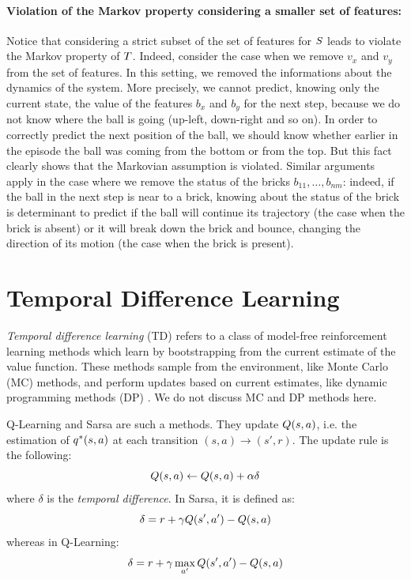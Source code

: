 \begin{example}
	\paragraph{Violation of the Markov property considering a smaller set of features:}
	Notice that considering a strict subset of the set of features for $S$ leads to violate the Markov property of $T$. Indeed, consider the case when we remove $v_x$ and $v_y$ from the set of features. In this setting, we removed the informations about the dynamics of the system. More precisely, we cannot predict, knowing only the current state, the value of the features $b_x$ and $b_y$ for the next step, because we do not know where the ball is going (up-left, down-right and so on). In order to correctly predict the next position of the ball, we should know whether earlier in the episode the ball was coming from the bottom or from the top. But this fact clearly shows that the Markovian assumption is violated. Similar arguments apply in the case where we remove the status of the bricks $b_{11}, \dots, b_{nm}$: indeed, if the ball in the next step is near to a brick, knowing about the status of the brick is determinant to predict if the ball will continue its trajectory (the case when the brick is absent) or it will break down the brick and bounce, changing the direction of its motion (the case when the brick is present).
	
\end{example}

\section{Temporal Difference Learning}
\label{sect:temporal-difference-learning}
\emph{Temporal difference learning} (TD) \citep{Sutton1988} refers to a class of model-free reinforcement learning methods which learn by bootstrapping from the current estimate of the value function. These methods sample from the environment, like Monte Carlo (MC) methods, and perform updates based on current estimates, like dynamic programming methods (DP) \citep{Bellman:1957}. We do not discuss MC and DP methods here.

Q-Learning \citep{watkins1989learning, Watkins1992} and Sarsa are such a methods. They update $Q(s, a)$, i.e. the estimation of $q^*(s, a)$ at each transition $(s, a) \to (s', r)$. The update rule is the following:
\begin{equation}\label{td-update-rule}
Q(s, a) \leftarrow Q(s, a) + \alpha \delta
\end{equation}
where $\delta$ is the \emph{temporal difference}. In Sarsa, it is defined as:
\begin{equation}\label{def:temporal-difference}
\delta = r + \gamma Q(s', a') - Q(s, a)
\end{equation}
whereas in Q-Learning:
\begin{equation}
\delta = r + \gamma \max_{a'} Q(s', a') - Q(s, a)
\end{equation}

